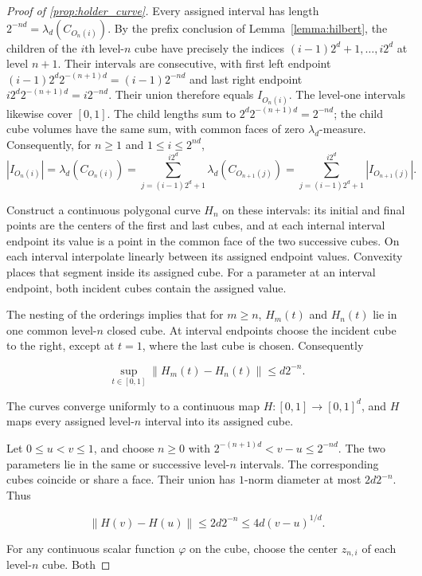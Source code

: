 \begin{proof}[Proof of \cref{prop:holder_curve}]
Every assigned interval has length $2^{-nd}=\lambda_d(C_{O_n(i)})$. By the prefix conclusion of Lemma~\ref{lemma:hilbert}, the children of the $i$th level-$n$ cube have precisely the indices $(i-1)2^d+1,\ldots,i2^d$ at level $n+1$. Their intervals are consecutive, with first left endpoint $(i-1)2^d2^{-(n+1)d}=(i-1)2^{-nd}$ and last right endpoint $i2^d2^{-(n+1)d}=i2^{-nd}$. Their union therefore equals $I_{O_n(i)}$. The level-one intervals likewise cover $[0,1]$. The child lengths sum to $2^d2^{-(n+1)d}=2^{-nd}$; the child cube volumes have the same sum, with common faces of zero $\lambda_d$-measure. Consequently, for $n\geqslant1$ and $1\leqslant i\leqslant2^{nd}$,
\begin{equation}
|I_{O_n(i)}|=\lambda_d(C_{O_n(i)})=\sum_{j=(i-1)2^d+1}^{i2^d}\lambda_d(C_{O_{n+1}(j)})=\sum_{j=(i-1)2^d+1}^{i2^d}|I_{O_{n+1}(j)}|.\label{eq:sum_I}
\end{equation}\par 

Construct a continuous polygonal curve $H_n$ on these intervals: its initial and final points are the centers of the first and last cubes, and at each internal interval endpoint its value is a point in the common face of the two successive cubes. On each interval interpolate linearly between its assigned endpoint values. Convexity places that segment inside its assigned cube. For a parameter at an interval endpoint, both incident cubes contain the assigned value. 

The nesting of the orderings implies that for $m\geqslant n$, $H_m(t)$ and $H_n(t)$ lie in one common level-$n$ closed cube. At interval endpoints choose the incident cube to the right, except at $t=1$, where the last cube is chosen. Consequently

\[
\sup_{t\in[0,1]}\|H_m(t)-H_n(t)\|\leqslant d2^{-n}.
\]

The curves converge uniformly to a continuous map $H:[0,1]\rightarrow[0,1]^d$, and $H$ maps every assigned level-$n$ interval into its assigned cube. 

Let $0\leqslant u<v\leqslant1$, and choose $n\geqslant0$ with $2^{-(n+1)d}<v-u\leqslant2^{-nd}$. The two parameters lie in the same or successive level-$n$ intervals. The corresponding cubes coincide or share a face. Their union has $1$-norm diameter at most $2d2^{-n}$. Thus

\[
\|H(v)-H(u)\|\leqslant2d2^{-n}\leqslant4d(v-u)^{1/d}.
\]

For any continuous scalar function $\varphi$ on the cube, choose the center $z_{n,i}$ of each level-$n$ cube. Both


\end{proof}
